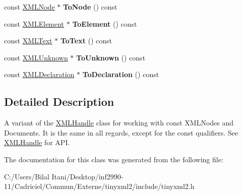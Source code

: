 \begin{DoxyCompactItemize}
\item 
const \hyperlink{classtinyxml2_1_1_x_m_l_node}{X\+M\+L\+Node} $\ast$ {\bfseries To\+Node} () const \hypertarget{classtinyxml2_1_1_x_m_l_const_handle_a95d0256318c10c3f75fa5f8ffb3e4bc1}{}\label{classtinyxml2_1_1_x_m_l_const_handle_a95d0256318c10c3f75fa5f8ffb3e4bc1}

\item 
const \hyperlink{classtinyxml2_1_1_x_m_l_element}{X\+M\+L\+Element} $\ast$ {\bfseries To\+Element} () const \hypertarget{classtinyxml2_1_1_x_m_l_const_handle_a5a48adefc2a5e70d4ce5b55692a0e2f9}{}\label{classtinyxml2_1_1_x_m_l_const_handle_a5a48adefc2a5e70d4ce5b55692a0e2f9}

\item 
const \hyperlink{classtinyxml2_1_1_x_m_l_text}{X\+M\+L\+Text} $\ast$ {\bfseries To\+Text} () const \hypertarget{classtinyxml2_1_1_x_m_l_const_handle_ad86ca7dbb20d0495ae357fe7a866e0be}{}\label{classtinyxml2_1_1_x_m_l_const_handle_ad86ca7dbb20d0495ae357fe7a866e0be}

\item 
const \hyperlink{classtinyxml2_1_1_x_m_l_unknown}{X\+M\+L\+Unknown} $\ast$ {\bfseries To\+Unknown} () const \hypertarget{classtinyxml2_1_1_x_m_l_const_handle_acb358a329e54fa204ed2d0b181566828}{}\label{classtinyxml2_1_1_x_m_l_const_handle_acb358a329e54fa204ed2d0b181566828}

\item 
const \hyperlink{classtinyxml2_1_1_x_m_l_declaration}{X\+M\+L\+Declaration} $\ast$ {\bfseries To\+Declaration} () const \hypertarget{classtinyxml2_1_1_x_m_l_const_handle_a5de0c175845bc30a6f9b3d88d8877eaf}{}\label{classtinyxml2_1_1_x_m_l_const_handle_a5de0c175845bc30a6f9b3d88d8877eaf}

\end{DoxyCompactItemize}


\subsection{Detailed Description}
A variant of the \hyperlink{classtinyxml2_1_1_x_m_l_handle}{X\+M\+L\+Handle} class for working with const X\+M\+L\+Nodes and Documents. It is the same in all regards, except for the \textquotesingle{}const\textquotesingle{} qualifiers. See \hyperlink{classtinyxml2_1_1_x_m_l_handle}{X\+M\+L\+Handle} for A\+PI. 

The documentation for this class was generated from the following file\+:\begin{DoxyCompactItemize}
\item 
C\+:/\+Users/\+Bilal Itani/\+Desktop/inf2990-\/11/\+Cadriciel/\+Commun/\+Externe/tinyxml2/include/tinyxml2.\+h\end{DoxyCompactItemize}
